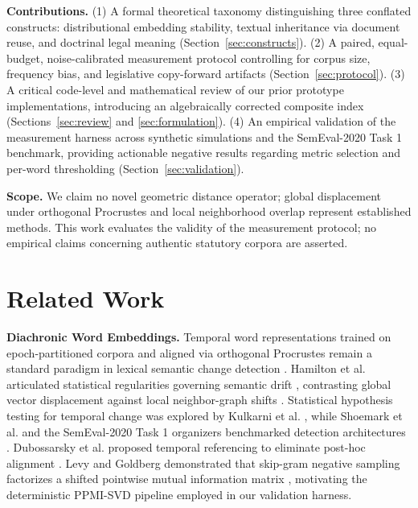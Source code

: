 \documentclass[conference]{IEEEtran}
\begin{document}
\textbf{Contributions.} (1) A formal theoretical taxonomy distinguishing three conflated constructs: distributional embedding stability, textual inheritance via document reuse, and doctrinal legal meaning (Section~\ref{sec:constructs}). (2) A paired, equal-budget, noise-calibrated measurement protocol controlling for corpus size, frequency bias, and legislative copy-forward artifacts (Section~\ref{sec:protocol}). (3) A critical code-level and mathematical review of our prior prototype implementations, introducing an algebraically corrected composite index (Sections~\ref{sec:review} and \ref{sec:formulation}). (4) An empirical validation of the measurement harness across synthetic simulations and the SemEval-2020 Task 1 benchmark, providing actionable negative results regarding metric selection and per-word thresholding (Section~\ref{sec:validation}).

\textbf{Scope.} We claim no novel geometric distance operator; global displacement under orthogonal Procrustes \cite{hamilton2016diachronic} and local neighborhood overlap \cite{hamilton2016cultural, gonen2020simple} represent established methods. This work evaluates the validity of the measurement protocol; no empirical claims concerning authentic statutory corpora are asserted.

\section{Related Work}
\textbf{Diachronic Word Embeddings.} Temporal word representations trained on epoch-partitioned corpora \cite{mikolov2013efficient} and aligned via orthogonal Procrustes \cite{schonemann1966generalized} remain a standard paradigm in lexical semantic change detection \cite{kutuzov2018diachronic, tahmasebi2021survey}. Hamilton et al. articulated statistical regularities governing semantic drift \cite{hamilton2016diachronic}, contrasting global vector displacement against local neighbor-graph shifts \cite{hamilton2016cultural}. Statistical hypothesis testing for temporal change was explored by Kulkarni et al. \cite{kulkarni2015statistically}, while Shoemark et al. and the SemEval-2020 Task 1 organizers benchmarked detection architectures \cite{shoemark2019room, schlechtweg2020semeval}. Dubossarsky et al. proposed temporal referencing to eliminate post-hoc alignment \cite{dubossarsky2019time}. Levy and Goldberg demonstrated that skip-gram negative sampling factorizes a shifted pointwise mutual information matrix \cite{levy2014neural}, motivating the deterministic PPMI-SVD pipeline employed in our validation harness.
\end{document}
